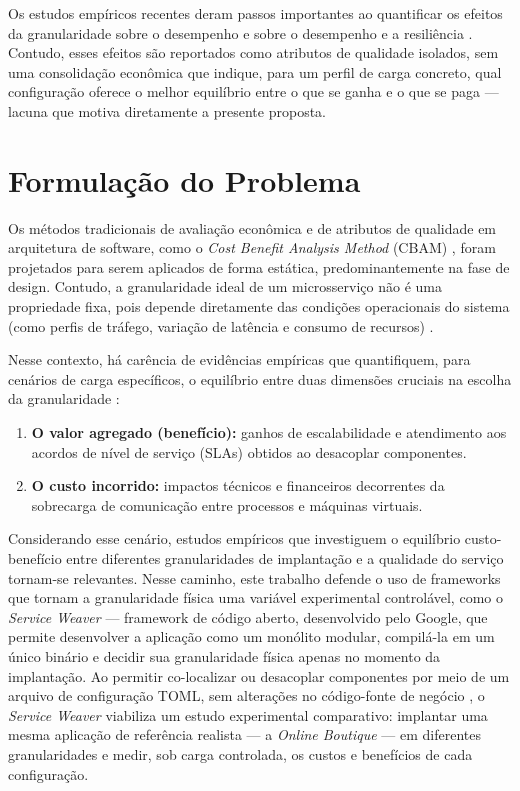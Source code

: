 Os estudos empíricos recentes deram passos importantes ao quantificar os efeitos da granularidade sobre o desempenho \cite{mendonca2024serviceweaver} e sobre o desempenho e a resiliência \cite{rego2025granularity}. Contudo, esses efeitos são reportados como atributos de qualidade isolados, sem uma consolidação econômica que indique, para um perfil de carga concreto, qual configuração oferece o melhor equilíbrio entre o que se ganha e o que se paga --- lacuna que motiva diretamente a presente proposta.

\section{Formulação do Problema}

Os métodos tradicionais de avaliação econômica e de atributos de qualidade em arquitetura de software, como o \textit{Cost Benefit Analysis Method} (CBAM) \cite{asundi2001cbam}, foram projetados para serem aplicados de forma estática, predominantemente na fase de design. Contudo, a granularidade ideal de um microsserviço não é uma propriedade fixa, pois depende diretamente das condições operacionais do sistema (como perfis de tráfego, variação de latência e consumo de recursos) \cite{hassan2020microservice, hassan2017ambients}.

Nesse contexto, há carência de evidências empíricas que quantifiquem, para cenários de carga específicos, o equilíbrio entre duas dimensões cruciais na escolha da granularidade \cite{hassan2020microservice}:
\begin{enumerate}
    \item \textbf{O valor agregado (benefício):} ganhos de escalabilidade e atendimento aos acordos de nível de serviço (SLAs) obtidos ao desacoplar componentes.
    \item \textbf{O custo incorrido:} impactos técnicos e financeiros decorrentes da sobrecarga de comunicação entre processos e máquinas virtuais.
\end{enumerate}

Considerando esse cenário, estudos empíricos que investiguem o equilíbrio custo-benefício entre diferentes granularidades de implantação e a qualidade do serviço tornam-se relevantes. Nesse caminho, este trabalho defende o uso de frameworks que tornam a granularidade física uma variável experimental controlável, como o \textit{Service Weaver} \cite{ghemawat2023serviceweaver} --- framework de código aberto, desenvolvido pelo Google, que permite desenvolver a aplicação como um monólito modular, compilá-la em um único binário e decidir sua granularidade física apenas no momento da implantação. Ao permitir co-localizar ou desacoplar componentes por meio de um arquivo de configuração TOML, sem alterações no código-fonte de negócio \cite{mendonca2024serviceweaver}, o \textit{Service Weaver} viabiliza um estudo experimental comparativo: implantar uma mesma aplicação de referência realista --- a \textit{Online Boutique} \cite{mendonca2024serviceweaver} --- em diferentes granularidades e medir, sob carga controlada, os custos e benefícios de cada configuração.

